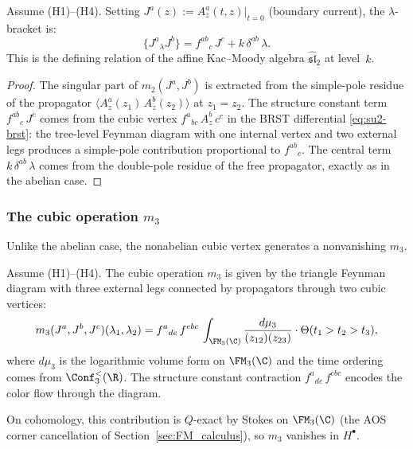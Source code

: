 \begin{proposition}
Assume \textrm{(H1)--(H4)}. Setting
$J^a(z) := A_z^a(t,z)|_{t=0}$ (boundary current), the
$\lambda$-bracket is:
\begin{equation}%
\{J^a{}_\lambda J^b\}
= f^{ab}{}_c\, J^c + k\, \delta^{ab}\, \lambda.
\end{equation}
This is the defining relation of the affine Kac--Moody algebra
$\widehat{\mathfrak{sl}}_2$ at level~$k$.
\end{proposition}

\begin{proof}
The singular part of $m_2(J^a, J^b)$ is extracted from the
simple-pole residue of the propagator
$\langle A_z^a(z_1)\, A_{\bar z}^b(z_2)\rangle$ at $z_1 = z_2$.
The structure constant term $f^{ab}{}_c\, J^c$ comes from the
cubic vertex $f^a{}_{bc}\, A_z^b\, c^c$ in the BRST differential
\eqref{eq:su2-brst}: the tree-level Feynman diagram with one
internal vertex and two external legs produces a simple-pole
contribution proportional to $f^{ab}{}_c$. The central term
$k\, \delta^{ab}\, \lambda$ comes from the double-pole residue of
the free propagator, exactly as in the abelian case.
\end{proof}

\subsubsection{The cubic operation $m_3$}

Unlike the abelian case, the nonabelian cubic vertex generates a
nonvanishing $m_3$.

\begin{proposition}[Nonabelian $m_3$]
Assume \textrm{(H1)--(H4)}. The cubic operation $m_3$ is given
by the triangle Feynman diagram with three external legs
connected by propagators through two cubic vertices:
\begin{equation}%
m_3(J^a, J^b, J^c)(\lambda_1, \lambda_2)
= f^{a}{}_{de}\, f^{ebc}\,
 \int_{\FM_3(\C)} \frac{d\mu_3}{(z_{12})(z_{23})}
 \cdot \Theta(t_1 > t_2 > t_3),
\end{equation}
where $d\mu_3$ is the logarithmic volume form on $\FM_3(\C)$
and the time ordering comes from $\Conf_3^{<}(\R)$.
The structure constant contraction
$f^{a}{}_{de}\, f^{ebc}$ encodes the color flow through the
diagram.

On cohomology, this contribution is $Q$-exact by Stokes on
$\FM_3(\C)$ (the AOS corner cancellation of
Section~\ref{sec:FM_calculus}), so $m_3$ vanishes in $H^\bullet$.
\end{proposition}

